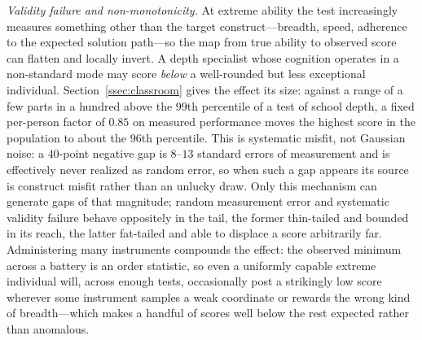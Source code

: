 \documentclass{article}
\begin{document}
\emph{Validity failure and non-monotonicity.} At extreme ability the test increasingly measures something other than the target construct---breadth, speed, adherence to the expected solution path---so the map from true ability to observed score can flatten and locally invert. A depth specialist whose cognition operates in a non-standard mode may score \emph{below} a well-rounded but less exceptional individual. Section~\ref{ssec:classroom} gives the effect its size: against a range of a few parts in a hundred above the 99th percentile of a test of school depth, a fixed per-person factor of $0.85$ on measured performance moves the highest score in the population to about the 96th percentile. This is systematic misfit, not Gaussian noise: a $40$-point negative gap is $8$--$13$ standard errors of measurement and is effectively never realized as random error, so when such a gap appears its source is construct misfit rather than an unlucky draw. Only this mechanism can generate gaps of that magnitude; random measurement error and systematic validity failure behave oppositely in the tail, the former thin-tailed and bounded in its reach, the latter fat-tailed and able to displace a score arbitrarily far. Administering many instruments compounds the effect: the observed minimum across a battery is an order statistic, so even a uniformly capable extreme individual will, across enough tests, occasionally post a strikingly low score wherever some instrument samples a weak coordinate or rewards the wrong kind of breadth---which makes a handful of scores well below the rest expected rather than anomalous.
\end{document}
